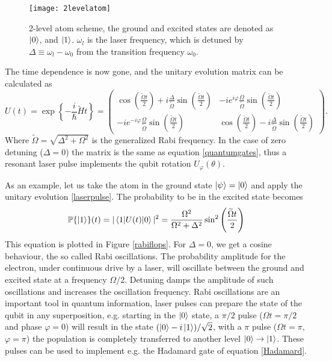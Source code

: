 \begin{figure}
\centering
\texttt{[image: 2levelatom]}
\caption{2-level atom scheme, the ground and excited states are denoted as $\ket{0}$, and $\ket{1}$. $\omega_l$ is the laser frequency, which is detuned by $\Delta \equiv \omega_l - \omega_0$ from the transition frequency $\omega_0$.}
\label{2levelatom}
\end{figure}
The time dependence is now gone, and the unitary evolution matrix can be calculated as
\begin{equation}
\label{laserpulse}
U(t) = \exp\left\{-\frac{i}{\hbar} \widetilde{H} t \right\} =
 \begin{pmatrix}
  \cos\left(\frac{\widetilde{\Omega} t}{2}\right) + i \frac{\Delta}{\widetilde{\Omega}} \sin\left(\frac{\widetilde{\Omega} t}{2}\right) & -ie^{i\varphi}\frac{\Omega}{\widetilde{\Omega}}  \sin\left(\frac{\widetilde{\Omega} t}{2}\right) \\
  -ie^{-i\varphi}\frac{\Omega}{\widetilde{\Omega}}  \sin\left(\frac{\widetilde{\Omega} t}{2}\right)  & \cos\left(\frac{\widetilde{\Omega} t}{2}\right) - i \frac{\Delta}{\widetilde{\Omega}} \sin\left(\frac{\widetilde{\Omega} t}{2}\right)
\end{pmatrix}.
\end{equation}
Where $\widetilde{\Omega} = \sqrt{\Delta^2 + \Omega^2}$ is the generalized Rabi frequency. In the case of zero detuning ($\Delta = 0$) the matrix is the same as equation \eqref{quantumgates}, thus a resonant laser pulse implements the qubit rotation $U_{\varphi}(\theta)$.\par
As an example, let us take the atom in the ground state $\ket{\psi} = \ket{0}$ and apply the unitary evolution \eqref{laserpulse}. The probability to be in the excited state becomes
\begin{equation}
\label{eq:rabifrequency}
\mathbb{P}\{\ket{1}\}(t) = |\braket{1|U(t)|0}|^2 = \frac{\Omega^2}{\Omega^2+\Delta^2} \sin^2\left(\frac{\widetilde{\Omega}t}{2} \right)
\end{equation}
This equation is plotted in Figure \ref{rabiflops}. For $\Delta = 0$, we get a cosine behaviour, the so called Rabi oscillations. The probability amplitude for the electron, under continuous drive by a laser, will oscillate between the ground and excited state at a frequency $\Omega/2$. Detuning damps the amplitude of such oscillations and increases the oscillation frequency. Rabi oscillations are an important tool in quantum information, laser pulses can prepare the state of the qubit in any superposition, e.g. starting in the $\ket{0}$ state, a $\pi/2$ pulse ($\Omega t = \pi/2$ and phase $\varphi=0$) will result in the state $(\ket{0} - i\ket{1})/\sqrt{2}$, with a $\pi$ pulse ($\Omega t = \pi$, $\varphi=\pi$) the population is completely transferred to another level $\ket{0}\to \ket{1}$. These pulses can be used to implement e.g. the Hadamard gate of equation \eqref{Hadamard}.

